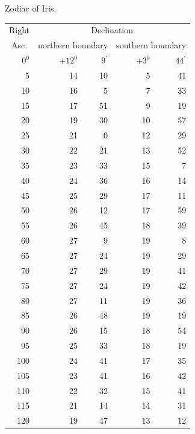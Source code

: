 \begin{center}
Zodiac of Iris.
\end{center}
\begingroup\small
\setlength{\tabcolsep}{7pt}
\renewcommand{\arraystretch}{1.15}
\begin{center}
\begin{tabular}{|r|r@{\;}r|r@{\;}r|}
\multicolumn{1}{|c|}{Right}&\multicolumn{4}{c|}{Declination}\\
\multicolumn{1}{|c|}{Asc.}&\multicolumn{2}{c|}{northern boundary}&\multicolumn{2}{c|}{southern boundary}\\
\(0^{0}\)&\(+12^{0}\)&\(9^{\prime}\)&\(+3^{0}\)&\(44^{\prime}\)\\
5&14&10&5&41\\
10&16&5&7&33\\
15&17&51&9&19\\
20&19&30&10&57\\
25&21&0&12&29\\
30&22&21&13&52\\
35&23&33&15&7\\
40&24&36&16&14\\
45&25&29&17&11\\
50&26&12&17&59\\
55&26&45&18&39\\
60&27&9&19&8\\
65&27&24&19&29\\
70&27&29&19&41\\
75&27&24&19&42\\
80&27&11&19&36\\
85&26&48&19&19\\
90&26&15&18&54\\
95&25&33&18&19\\
100&24&41&17&35\\
105&23&41&16&42\\
110&22&32&15&41\\
115&21&14&14&31\\
120&19&47&13&12\\\hline
\end{tabular}
\end{center}
